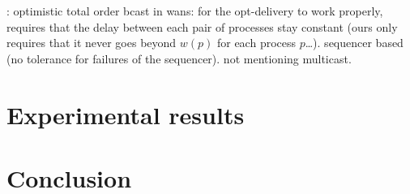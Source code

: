 \documentclass[times, 10pt]{article}
\begin{document}
\cite{sousa2002oto}: optimistic total order bcast in wans: for the opt-delivery to work properly, requires that the delay between each pair of processes stay constant (ours only requires that it never goes beyond $w(p)$ for each process $p$\ldots). sequencer based (no tolerance for failures of the sequencer). not mentioning multicast.

\section{Experimental results}

\section{Conclusion}

%
%


\end{document}
